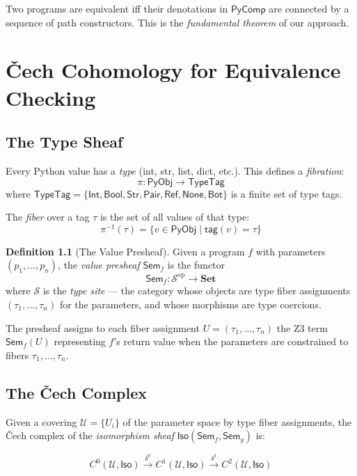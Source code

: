 \documentclass[11pt,a4paper]{report}
\theoremstyle{definition}
\newtheorem{definition}{Definition}[chapter]
\theoremstyle{plain}
\newcommand{\Set}{\mathbf{Set}}
\newcommand{\PyObj}{\mathsf{PyObj}}
\newcommand{\covers}{\mathcal{U}}
\newcommand{\Sem}{\mathsf{Sem}}
\newcommand{\Iso}{\mathsf{Iso}}
\newcommand{\site}{\mathcal{S}}
\begin{document}
Two programs are equivalent iff their denotations in $\mathsf{PyComp}$
are connected by a sequence of path constructors.  This is the
\emph{fundamental theorem} of our approach.


\chapter{\v{C}ech Cohomology for Equivalence Checking}
\label{ch:cohomology}

\section{The Type Sheaf}

Every Python value has a \emph{type} (int, str, list, dict, etc.).
This defines a \emph{fibration}:
\[
  \pi : \PyObj \to \mathsf{TypeTag}
\]
where $\mathsf{TypeTag} = \{\mathsf{Int}, \mathsf{Bool}, \mathsf{Str},
\mathsf{Pair}, \mathsf{Ref}, \mathsf{None}, \mathsf{Bot}\}$ is a
finite set of type tags.

The \emph{fiber} over a tag $\tau$ is the set of all values of that
type:
\[
  \pi^{-1}(\tau) = \{v \in \PyObj \mid \mathsf{tag}(v) = \tau\}
\]

\begin{definition}[The Value Presheaf]
Given a program $f$ with parameters $(p_1, \ldots, p_n)$, the
\emph{value presheaf} $\Sem_f$ is the functor
\[
  \Sem_f : \site^{\mathrm{op}} \to \Set
\]
where $\site$ is the \emph{type site} --- the category whose objects
are type fiber assignments $(\tau_1, \ldots, \tau_n)$ for the
parameters, and whose morphisms are type coercions.

The presheaf assigns to each fiber assignment $U = (\tau_1, \ldots,
\tau_n)$ the Z3 term $\Sem_f(U)$ representing $f$'s return value
when the parameters are constrained to fibers $\tau_1, \ldots, \tau_n$.
\end{definition}

\section{The \v{C}ech Complex}

Given a covering $\covers = \{U_i\}$ of the parameter space by type
fiber assignments, the \v{C}ech complex of the \emph{isomorphism sheaf}
$\Iso(\Sem_f, \Sem_g)$ is:

\[
  C^0(\covers, \Iso) \xrightarrow{\delta^0}
  C^1(\covers, \Iso) \xrightarrow{\delta^1}
  C^2(\covers, \Iso)
\]
\end{document}
